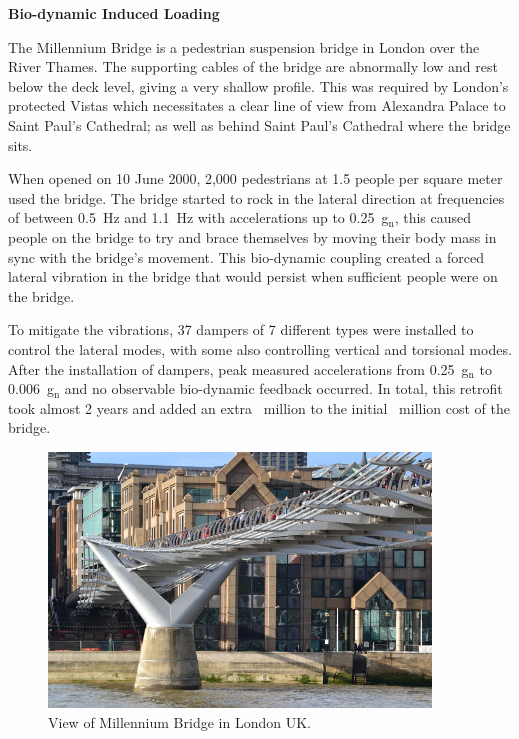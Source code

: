 \documentclass[12pt,letter]{article}
\begin{document}
\begin{vibration_case_study}
	\textbf{Bio-dynamic Induced Loading}
	
	\noindent The Millennium Bridge is a pedestrian suspension bridge in London over the River Thames. The supporting cables of the bridge are abnormally low and rest below the deck level, giving a very shallow profile. This was required by London's protected Vistas which necessitates a clear line of view from Alexandra Palace to Saint Paul's Cathedral; as well as behind Saint Paul's Cathedral where the bridge sits. 

	When opened on 10 June 2000, 2,000 pedestrians at  1.5 people per square meter used the bridge. The bridge started to rock in the lateral direction at frequencies of between 0.5~Hz and 1.1~Hz with accelerations up to 0.25~g$_\text{n}$, this caused people on the bridge to try and brace themselves by moving their body mass in sync with the bridge's movement. This bio-dynamic coupling created a forced lateral vibration in the bridge that would persist when sufficient people were on the bridge.   

	To mitigate the vibrations, 37 dampers of 7 different types were installed to control the lateral modes, with some also controlling vertical and torsional modes. After the installation of dampers, peak measured accelerations from 0.25~g$_\text{n}$ to 0.006~g$_\text{n}$ and no observable bio-dynamic feedback occurred. In total, this retrofit took almost 2 years and added an extra ~million to the initial ~million cost of the bridge.
	
	\begin{figure}[H]
		\centering
		\includegraphics[width=4in]{../figures/Under_the_Millennium_Bridge}
		\caption{View of Millennium Bridge in London UK\protect\footnotemark[1].}
	\end{figure}
\end{vibration_case_study}
\end{document}
